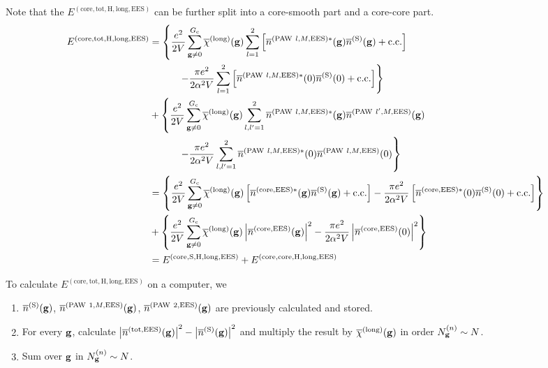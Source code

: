 \documentclass[paper=a4, fontsize=11pt]{article} %
\numberwithin{equation}{section} %
\numberwithin{figure}{section} %
\numberwithin{table}{section} %
\newcommand{\ol}{\overline}
\newcommand{\bg}{{\bf{g}}}
\newcommand{\rS}{{\mathrm{S}}}
\newcommand{\rEES}{{\mathrm{EES}}}
\newcommand{\rcore}{{\mathrm{core}}}
\newcommand{\rcc}{{\mathrm{c.c.}}}
\newcommand{\rlong}{{\mathrm{long}}}
\newcommand{\rP}{{\mathrm{PAW}}}
\newcommand{\rH}{{\mathrm{H}}}
\newcommand{\rtot}{{\mathrm{tot}}}
\newcommand{\Ngn}{{N^{(n)}_\bg}}
\newcommand{\Gc}{{G_{\mathrm{c}}}}
\begin{document}
Note that the $E^{(\rcore,\rtot,\rH,\rlong,\rEES)}$ can be further split into a core-smooth part and a core-core part.
\begin{equation} \label{eq:HlongEES}
\begin{split}
E^{(\rcore,\rtot,\rH,\rlong,\rEES)}
&= \left\{\frac{e^2}{2V} \sum_{\bg \neq 0}^\Gc \ol \chi^{(\rlong)} (\bg) \sum_{l=1}^2\left[ \ol{n}^{(\rP\ l,M,\rEES)*}(\bg)\ol{n}^{(\rS)}(\bg) + \rcc \right] \right.\\
&\left. \ \ \ \ \ \ \ \ \ - \frac{\pi e^2}{2\alpha^2 V}\sum_{l=1}^2\left[ \ol{n}^{(\rP\ l,M,\rEES)*}(0)\ol{n}^{(\rS)}(0) + \rcc \right] \right\} \\
&+ \left\{\frac{e^2}{2V} \sum_{\bg \neq 0}^\Gc \ol \chi^{(\rlong)} (\bg) \sum_{l,l'=1}^2 \ol{n}^{(\rP\ l,M,\rEES)*}(\bg)\ol{n}^{(\rP\ l',M,\rEES)}(\bg)\right.\\
&\left. \ \ \ \ \ \ \ \ \  - \frac{\pi e^2}{2\alpha^2 V}\sum_{l,l'=1}^2 \ol{n}^{(\rP\ l,M,\rEES)*}(0) \ol{n}^{(\rP\ l,M,\rEES)}(0)\right\} \\
&= \left\{\frac{e^2}{2V} \sum_{\bg \neq 0}^\Gc \ol \chi^{(\rlong)} (\bg) \left[ \ol{n}^{(\rcore,\rEES)*}(\bg)\ol{n}^{(\rS)}(\bg) + \rcc \right]- \frac{\pi e^2}{2\alpha^2 V}\left[ \ol{n}^{(\rcore,\rEES)*}(0)\ol{n}^{(\rS)}(0) + \rcc \right] \right\} \\
&+ \left\{\frac{e^2}{2V} \sum_{\bg \neq 0}^\Gc \ol \chi^{(\rlong)} (\bg) \left|\ol{n}^{(\rcore,\rEES)}(\bg)\right|^2 - \frac{\pi e^2}{2\alpha^2 V} \left|\ol{n}^{(\rcore,\rEES)}(0)\right|^2 \right\} \\
&= E^{(\rcore,\rS,\rH,\rlong,\rEES)}+ E^{(\rcore,\rcore,\rH,\rlong,\rEES)}\\
\end{split}
\end{equation}


To calculate $E^{(\rcore,\rtot,\rH,\rlong,\rEES)}$ on a computer, we
\begin{enumerate}
\item $\ol n^{(\rS)}(\bg)$, $\ol n^{(\rP\ 1,M,\rEES)}(\bg)$, $\ol n^{(\rP\ 2,\rEES)}(\bg)$ are previously calculated and stored.
\item For every $\bg$, calculate $\left|\ol{n}^{(\rtot,\rEES)}(\bg)\right|^2 -  \left|\ol{n}^{(\rS)}(\bg)\right|^2$ and multiply the result by $\ol \chi^{(\rlong)} (\bg)$ in order $\Ngn \sim N$.
\item Sum over $\bg$ in $\Ngn \sim N$.
\end{enumerate}
\end{document}
